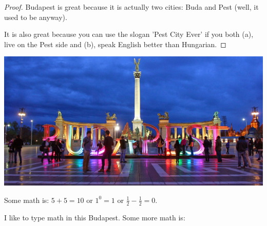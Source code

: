 \documentclass{article}
\begin{document}


\begin{proof}
Budapest is great because it is actually two cities: Buda and Pest (well, it used to be anyway).
\par It is also great because you can use the slogan 'Pest City Ever' if you both (a), live on the Pest side and (b), speak English better than Hungarian.
\end{proof}





\includegraphics[width=.5\linewidth]{budapest-web3}

\par Some math is: $5 + 5 = 10$ or $1^0 = 1$ or $\frac{1}{2} - \frac{1}{2} = 0$.
\par I like to type math in this Budapest. Some more math is:

\end{document}
